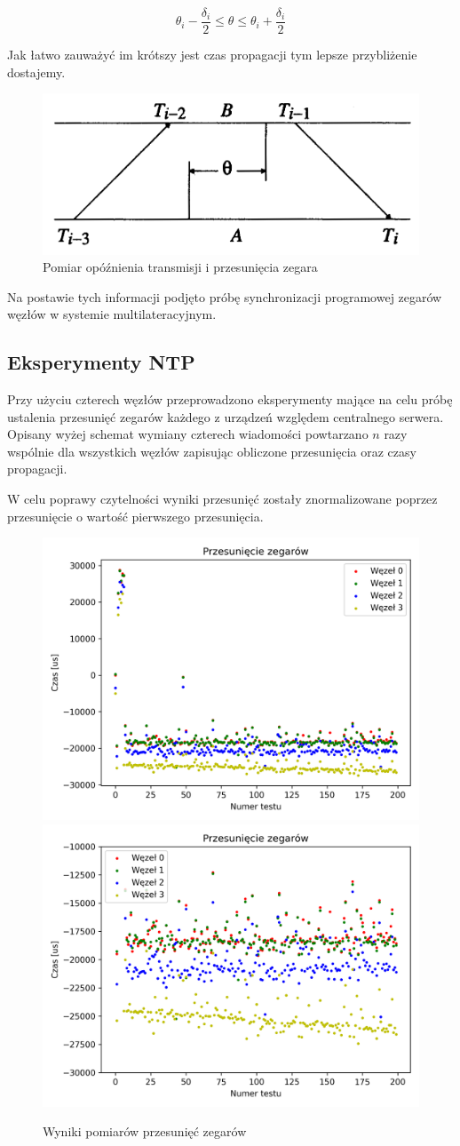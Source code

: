 \[\theta_i - \frac{\delta_i}{2} \leq \theta \leq \theta_i + \frac{\delta_i}{2}\]

Jak łatwo zauważyć im krótszy jest czas propagacji tym lepsze przybliżenie dostajemy.

\begin{figure}[h]
    \includegraphics[width=\textwidth]{pics/ntp.png}
\caption{Pomiar opóźnienia transmisji i przesunięcia zegara}
\label{fig:ntp}
\end{figure}

Na postawie tych informacji podjęto próbę synchronizacji programowej zegarów węzłów w systemie multilateracyjnym.

\subsection{Eksperymenty NTP}

Przy użyciu czterech węzłów przeprowadzono eksperymenty mające na celu próbę ustalenia przesunięć zegarów każdego z urządzeń względem centralnego serwera. Opisany wyżej schemat wymiany czterech wiadomości powtarzano $n$ razy wspólnie dla wszystkich węzłów zapisując obliczone przesunięcia oraz czasy propagacji.

W celu poprawy czytelności wyniki przesunięć zostały znormalizowane poprzez przesunięcie o wartość pierwszego przesunięcia.

\begin{figure}[h]
\centering
    \includegraphics[width=.49\textwidth]{pics/ntp_sync/offsets.png}
    \includegraphics[width=.49\textwidth]{pics/ntp_sync/offsets_close.png}
\caption{Wyniki pomiarów przesunięć zegarów}
\label{pic:offsets_ntp}
\end{figure}

